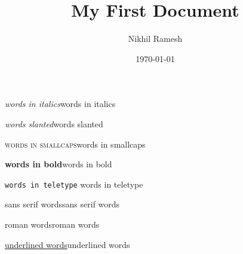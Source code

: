 \documentclass[a4paper,12pt]{article}
\begin{document}
\title{My First Document}
\author{Nikhil Ramesh}
\date{\today}
\maketitle

\textit{words in italics}words in italics

\textsl{words slanted}words slanted

\textsc{words in smallcaps}words in smallcaps

\textbf{words in bold}words in bold

\texttt{words in teletype}    words in teletype

\textsf{sans serif words}sans serif words

\textrm{roman words}roman words

\underline{underlined words}underlined words
\end{document}
